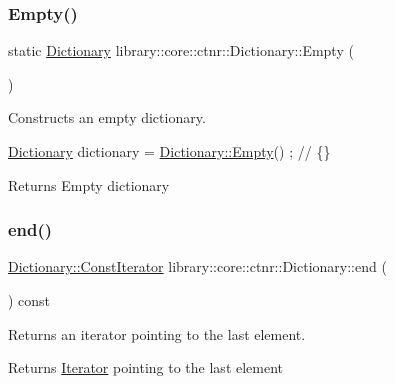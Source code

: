\subsubsection{\texorpdfstring{Empty()}{Empty()}}
{\footnotesize\ttfamily static \hyperlink{classlibrary_1_1core_1_1ctnr_1_1Dictionary}{Dictionary} library\+::core\+::ctnr\+::\+Dictionary\+::\+Empty (\begin{DoxyParamCaption}{ }\end{DoxyParamCaption})\hspace{0.3cm}{\ttfamily [static]}}



Constructs an empty dictionary. 


\begin{DoxyCode}
\hyperlink{classlibrary_1_1core_1_1ctnr_1_1Dictionary_a823a08112d9ee271f9fa5833f030ea1a}{Dictionary} dictionary = \hyperlink{classlibrary_1_1core_1_1ctnr_1_1Dictionary_a236f8efd7a01e7a91061e8ed933112b7}{Dictionary::Empty}() ; \textcolor{comment}{// \{\}}
\end{DoxyCode}


\begin{DoxyReturn}{Returns}
Empty dictionary 
\end{DoxyReturn}
\mbox{\label{classlibrary_1_1core_1_1ctnr_1_1Dictionary_ace2fb3bdb88a059090e8b0265d97e57e}} 
\subsubsection{\texorpdfstring{end()}{end()}\hspace{0.1cm}{\footnotesize\ttfamily [1/2]}}
{\footnotesize\ttfamily \hyperlink{classlibrary_1_1core_1_1ctnr_1_1Dictionary_1_1ConstIterator}{Dictionary\+::\+Const\+Iterator} library\+::core\+::ctnr\+::\+Dictionary\+::end (\begin{DoxyParamCaption}{ }\end{DoxyParamCaption}) const}



Returns an iterator pointing to the last element. 

\begin{DoxyReturn}{Returns}
\hyperlink{classlibrary_1_1core_1_1ctnr_1_1Dictionary_1_1Iterator}{Iterator} pointing to the last element 
\end{DoxyReturn}
\mbox{\label{classlibrary_1_1core_1_1ctnr_1_1Dictionary_a16ed18981bcf7ffdc7308801cc4b9d56}} 
